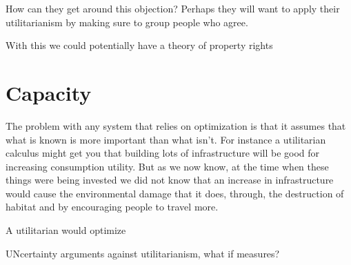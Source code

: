 How can they get around this objection? Perhaps they will want to apply their utilitarianism by making sure to group people who agree. 

With this we could potentially have a theory of property rights

\section{Capacity}


The problem with any system that relies on optimization is that it assumes that what is known is more important than what isn't. For instance a utilitarian calculus might get you that building lots of infrastructure will be good for increasing consumption utility. But as we now know, at the time when these things were being invested we did not know that an increase in infrastructure would cause the environmental damage that it does, through, the destruction of habitat and by encouraging people to travel more. 

A utilitarian would optimize 

UNcertainty arguments against utilitarianism, what if measures? 







